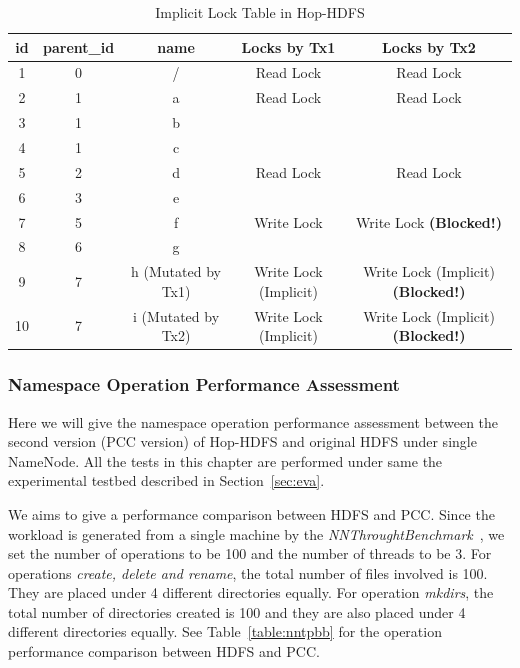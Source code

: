\documentclass[runningheads,a4paper]{llncs}
\begin{document}
\begin{table}[h]
	\centering
	\begin{tabular}{|c|c|c|c|c|}
		\hline
		\textbf{id} & \textbf{parent\_id} & \textbf{name} & \textbf{Locks by Tx1} & \textbf{Locks by Tx2} \\ \hline
		1 & 0 & / & Read Lock & Read Lock \\ \hline
		2 & 1 & a & Read Lock & Read Lock \\ \hline
		3 & 1 & b & ~ & ~ \\ \hline
		4 & 1 & c & ~ & ~ \\ \hline
		5 & 2 & d & Read Lock & Read Lock\\ \hline
		6 & 3 & e & ~ & ~ \\ \hline
		7 & 5 & f  & Write Lock & Write Lock \textbf{(Blocked!)} \\ \hline
		8 & 6 & g & ~ & ~ \\ \hline
		9 & 7 & h (Mutated by Tx1) & Write Lock (Implicit) & Write Lock (Implicit) \textbf{(Blocked!)}\\ \hline
		10 & 7 & i (Mutated by Tx2) & Write Lock (Implicit) & Write Lock (Implicit)  \textbf{(Blocked!)}\\ \hline
	\end{tabular}
	\caption{Implicit Lock Table in Hop-HDFS}
	\label{table:hoplockTableA}
\end{table}

\subsubsection{Namespace Operation Performance Assessment}
\label{subsub:exp}
Here we will give the namespace operation performance assessment between the second version (PCC version) of Hop-HDFS and original HDFS under single NameNode. All the tests in this chapter are performed under same the experimental testbed described in Section~\ref{sec:eva}.

We aims to give a performance comparison between HDFS and PCC. Since the workload is generated from a single machine by the \textit{NNThroughtBenchmark}~\cite{shvachko2010hdfs}, we set the number of operations to be 100 and the number of threads to be 3. For operations \textit{create, delete and rename}, the total number of files involved is 100. They are placed under 4 different directories equally. For operation \textit{mkdirs}, the total number of directories created is 100 and they are also placed under 4 different directories equally. See Table~\ref{table:nntpbb} for the operation performance comparison between HDFS and PCC.
\end{document}
